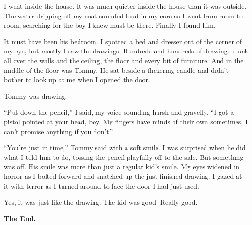 I went inside the house. It was much quieter inside the house than
it was outside. The water dripping off my coat sounded loud in my
ears as I went from room to room, searching for the boy I knew must
be there. Finally I found him.



It must have been his bedroom. I spotted a bed and dresser out of
the corner of my eye, but mostly I saw the drawings. Hundreds and
hundreds of drawings stuck all over the walls and the ceiling, the
floor and every bit of furniture. And in the middle of the floor
was Tommy. He sat beside a flickering candle and didn't
bother to look up at me when I opened the door.



Tommy was drawing.



``Put down the pencil,'' I said, my voice sounding harsh
and gravelly. ``I got a pistol pointed at your head, boy. My
fingers have minds of their own sometimes, I can't promise
anything if you don't.''



``You're just in time,'' Tommy said with a soft
smile. I was surprised when he did what I told him to do, tossing
the pencil playfully off to the side. But something was off. His
smile was more than just a regular kid's smile. My eyes
widened in horror as I bolted forward and snatched up the
just-finished drawing. I gazed at it with terror as I turned around
to face the door I had just used.



Yes, it was just like the drawing. The kid was good. Really
good.



{\bf The End.} 
 



